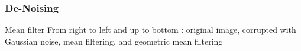 \documentclass{beamer}
\begin{document}
\begin{frame}
\frametitle{De-Noising}
\begin{block}{Mean filter}
\scriptsize{From right to left and up to bottom : original image, corrupted with Gaussian noise, mean filtering, and geometric mean filtering}\\
\end{block}
\end{frame}
\end{document}
